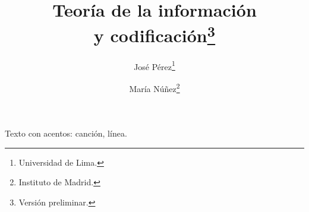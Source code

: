 \documentclass{article}
\title{Teor\'ia de la informaci\'on\\ y codificaci\'on\thanks{Versión preliminar.}}
\author{José Pérez\thanks{Universidad de Lima.} \and María Núñez\thanks{Instituto de Madrid.}}
\begin{document}
\maketitle
Texto con acentos: canción, línea.
\end{document}
